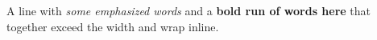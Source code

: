 A line with \emph{some emphasized words} and a
\textbf{bold run of words here} that together
exceed the width and wrap inline.
